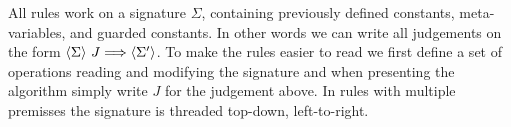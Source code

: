 All rules work on a signature $\Sigma$, containing previously defined
constants, meta-variables, and guarded constants.
%
In other words we can write all judgements on the form
\(\langle {\Sigma} \rangle ~ {J} \Longrightarrow \langle {\Sigma'} \rangle\).
%
To make the rules easier to read we first define a set of operations reading
and modifying the signature and when presenting the algorithm simply write $J$
for the judgement above. In rules with multiple premisses the signature is
threaded top-down, left-to-right. %


